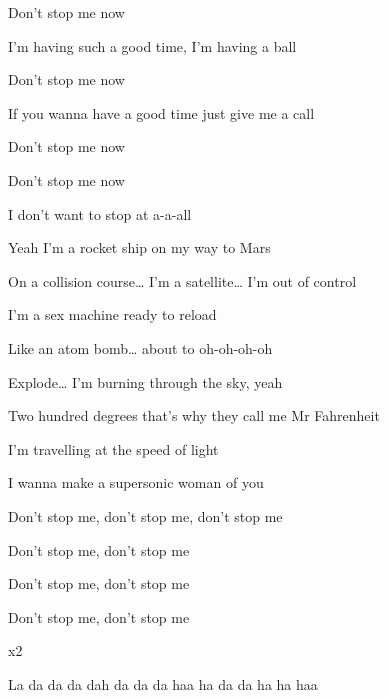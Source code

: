 \begin{song}
\begin{chorusbox}{\PrechorusAndChorus}
\bigskip

Don’t stop me now \par
I’m having such a good time, I’m having a ball \par
{}Don’t stop me now \par
If you wanna have a good time just give me a call \par
{}Don’t stop me now \par
\hspace{21ex}  \par
{}Don’t stop me now \par
\hspace{21ex}  \par
I don’t want to stop at a-a-all
\end{chorusbox}

\bigskip

Yeah I’m a rocket ship on my way to Mars \par
On a collision course… I’m a satellite… I’m out of control \par
I’m a sex machine ready to reload \par
Like an atom bomb… about to oh-oh-oh-oh \par

\bigskip

Explode… I’m burning through the sky, yeah \par
Two hundred degrees that’s why they call me Mr Fahrenheit \par
I’m travelling at the speed of light \par
I wanna make a supersonic woman of you \par

\bigskip

 \par
Don’t stop me, don’t stop me, don’t stop me  \par
Don’t stop me, don’t stop me  \par
Don’t stop me, don’t stop me  \par
Don’t stop me, don’t stop me  \par
{}     x2 \par

\bigskip

\PrechorusAndChorus \par

\bigskip

 La da da da dah da da da haa ha da da ha ha haa  \par

\end{song}
